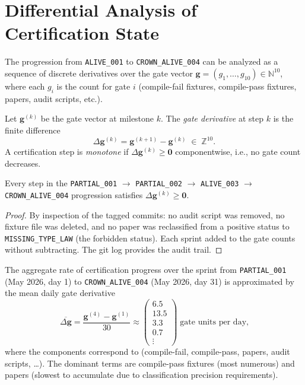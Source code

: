 \section{Differential Analysis of Certification State}
\label{sec:conc-diff}

The progression from \texttt{ALIVE\_001} to \texttt{CROWN\_ALIVE\_004} can be
analyzed as a sequence of discrete derivatives over the gate vector
$\mathbf{g} = (g_1, \ldots, g_{10}) \in \mathbb{N}^{10}$, where each $g_i$
is the count for gate $i$ (compile-fail fixtures, compile-pass fixtures,
papers, audit scripts, etc.).

\begin{definition}
Let $\mathbf{g}^{(k)}$ be the gate vector at milestone $k$. The
\emph{gate derivative} at step $k$ is the finite difference
\[
  \Delta\mathbf{g}^{(k)} = \mathbf{g}^{(k+1)} - \mathbf{g}^{(k)}
  \;\in\; \mathbb{Z}^{10}.
\]
A certification step is \emph{monotone} if $\Delta\mathbf{g}^{(k)} \geq
\mathbf{0}$ componentwise, i.e., no gate count decreases.
\end{definition}

\begin{proposition}
Every step in the \texttt{PARTIAL\_001} $\to$ \texttt{PARTIAL\_002} $\to$
\texttt{ALIVE\_003} $\to$ \texttt{CROWN\_ALIVE\_004} progression satisfies
$\Delta\mathbf{g}^{(k)} \geq \mathbf{0}$.
\end{proposition}

\begin{proof}
By inspection of the tagged commits: no audit script was removed, no fixture
file was deleted, and no paper was reclassified from a positive status to
\texttt{MISSING\_TYPE\_LAW} (the forbidden status). Each sprint added to the
gate counts without subtracting. The git log provides the audit trail.
\end{proof}

The aggregate rate of certification progress over the sprint from
\texttt{PARTIAL\_001} (May 2026, day 1) to \texttt{CROWN\_ALIVE\_004} (May
2026, day 31) is approximated by the mean daily gate derivative
\[
  \overline{\Delta\mathbf{g}} = \frac{\mathbf{g}^{(4)} - \mathbf{g}^{(1)}}{30}
  \approx \begin{pmatrix}6.5 \\ 13.5 \\ 3.3 \\ 0.7 \\ \vdots\end{pmatrix}
  \;\text{gate units per day,}
\]
where the components correspond to (compile-fail, compile-pass, papers, audit
scripts, \ldots). The dominant terms are compile-pass fixtures (most numerous)
and papers (slowest to accumulate due to classification precision requirements).


